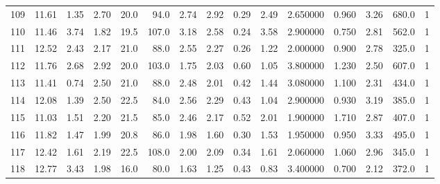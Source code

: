 \documentclass{article}
\begin{document}
\begin{tabular}{lrrrrrrrrrrrrrr}
    109 &    11.61 &        1.35 &  2.70 &               20.0 &       94.0 &           2.74 &        2.92 &                  0.29 &             2.49 &         2.650000 &  0.960 &                          3.26 &    680.0 &      1 \\
    110 &    11.46 &        3.74 &  1.82 &               19.5 &      107.0 &           3.18 &        2.58 &                  0.24 &             3.58 &         2.900000 &  0.750 &                          2.81 &    562.0 &      1 \\
    111 &    12.52 &        2.43 &  2.17 &               21.0 &       88.0 &           2.55 &        2.27 &                  0.26 &             1.22 &         2.000000 &  0.900 &                          2.78 &    325.0 &      1 \\
    112 &    11.76 &        2.68 &  2.92 &               20.0 &      103.0 &           1.75 &        2.03 &                  0.60 &             1.05 &         3.800000 &  1.230 &                          2.50 &    607.0 &      1 \\
    113 &    11.41 &        0.74 &  2.50 &               21.0 &       88.0 &           2.48 &        2.01 &                  0.42 &             1.44 &         3.080000 &  1.100 &                          2.31 &    434.0 &      1 \\
    114 &    12.08 &        1.39 &  2.50 &               22.5 &       84.0 &           2.56 &        2.29 &                  0.43 &             1.04 &         2.900000 &  0.930 &                          3.19 &    385.0 &      1 \\
    115 &    11.03 &        1.51 &  2.20 &               21.5 &       85.0 &           2.46 &        2.17 &                  0.52 &             2.01 &         1.900000 &  1.710 &                          2.87 &    407.0 &      1 \\
    116 &    11.82 &        1.47 &  1.99 &               20.8 &       86.0 &           1.98 &        1.60 &                  0.30 &             1.53 &         1.950000 &  0.950 &                          3.33 &    495.0 &      1 \\
    117 &    12.42 &        1.61 &  2.19 &               22.5 &      108.0 &           2.00 &        2.09 &                  0.34 &             1.61 &         2.060000 &  1.060 &                          2.96 &    345.0 &      1 \\
    118 &    12.77 &        3.43 &  1.98 &               16.0 &       80.0 &           1.63 &        1.25 &                  0.43 &             0.83 &         3.400000 &  0.700 &                          2.12 &    372.0 &      1 \\

\end{tabular}
\end{document}
